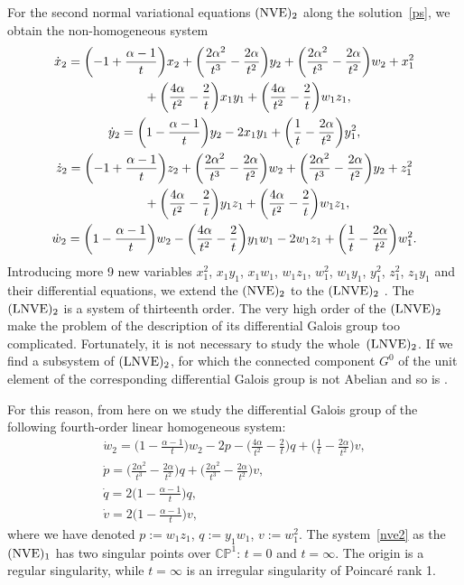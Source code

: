 \documentclass[10pt,a4paper]{amsart}
\numberwithin{equation}{section}
\begin{document}
 For the second normal variational equations $({\rm NVE})_2$ along the solution~\eqref{ps}, we obtain the
 non-homogeneous system
 \begin{gather*}
 \dot{x}_2 =
 \biggl(-1 + \frac{\alpha-1}{t}\biggr) x_2 + \biggl(\frac{2 \alpha^2}{t^3} - \frac{2 \alpha}{t^2}\biggr) y_2
 + \biggl(\frac{2 \alpha^2}{t^3} - \frac{2 \alpha}{t^2}\biggr) w_2
 + x_1^2 \\
 \hphantom{\dot{x}_2 =}{} +\biggl(\frac{4 \alpha}{t^2} - \frac{2}{t}\biggr) x_1 y_1 +
 \biggl(\frac{4 \alpha}{t^2} - \frac{2}{t}\biggr) w_1 z_1,\\
 \dot{y}_2 =
 \biggl(1 - \frac{ \alpha -1}{t} \biggr) y_2 -2 x_1 y_1 + \biggl(\frac{1}{t} - \frac{2 \alpha}{t^2}\biggr) y_1^2,\\
 \dot{z}_2 =
 \biggl(-1 + \frac{\alpha-1}{t} \biggr) z_2 +
 \biggl(\frac{2 \alpha^2}{t^3} - \frac{2 \alpha}{t^2}\biggr) w_2
 + \biggl(\frac{2 \alpha^2}{t^3} - \frac{2 \alpha}{t^2}\biggr) y_2 + z^2_1\\
 \hphantom{\dot{z}_2 =}{} + \biggl(\frac{4 \alpha}{t^2} - \frac{2}{t}\biggr) y_1 z_1 +
 \biggl(\frac{4 \alpha}{t^2} -\frac{2}{t}\biggr) w_1 z_1,\\
 \dot{w}_2 =
 \biggl(1 - \frac{\alpha-1}{t}\biggr) w_2 -
 \biggl(\frac{4 \alpha}{t^2} - \frac{2}{t}\biggr) y_1 w_1 - 2 w_1 z_1
 +\biggl(\frac{1}{t} - \frac{2 \alpha}{t^2}\biggr) w_1^2 .
 \end{gather*}
 Introducing more 9 new variables
 $x_1^2$, $x_1 y_1$, $x_1 w_1$, $w_1 z_1$, $w_1^2$, $w_1 y_1$, $y_1^2$, $z_1^2$, $z_1 y_1$ and their differential equations, we extend the $({\rm NVE})_2$ to the $({\rm LNVE})_2$ \cite{MRS}.
 The $({\rm LNVE})_2$ is a system of thirteenth order.
 The very high order of the $({\rm LNVE})_2$ make the problem of the description of its differential Galois group
 too complicated. Fortunately, it is not necessary to study the whole~$({\rm LNVE})_2$. If we find a subsystem
 of $({\rm LNVE})_2$, for which the connected component $G^0$ of the unit element of the corresponding
 differential Galois group is not Abelian and so is .

 For this reason, from here on we study the differential Galois group of the following fourth-order linear homogeneous system:
 \begin{gather}
 \dot{w}_2 =
 \biggl(1 - \frac{\alpha-1}{t}\biggr) w_2 - 2 p -
 \biggl(\frac{4 \alpha}{t^2} - \frac{2}{t}\biggr) q
 +\biggl(\frac{1}{t} - \frac{2 \alpha}{t^2}\biggr) v,\nonumber\\
 \dot{p} =
 \biggl(\frac{2 \alpha^2}{t^3} - \frac{2 \alpha}{t^2}\biggr) q
 + \biggl(\frac{2 \alpha^2}{t^3} - \frac{2 \alpha}{t^2}\biggr) v,\nonumber\\
 \dot{q} =
 2 \biggl(1- \frac{\alpha-1}{t}\biggr) q,\nonumber\\
 \dot{v} =
 2 \biggl(1- \frac{\alpha-1}{t}\biggr) v ,\label{nve2}
 \end{gather}
 where we have denoted $p:=w_1 z_1$, $q:=y_1 w_1$, $v:=w^2_1$. The system~\eqref{nve2} as the $({\rm NVE})_1$ has two singular
 points over $\mathbb{C}\mathbb{P}^1$: $t=0$ and $t=\infty$. The origin is a regular singularity, while $t=\infty$ is an irregular
 singularity of Poincar\'{e} rank 1.
\end{document}
